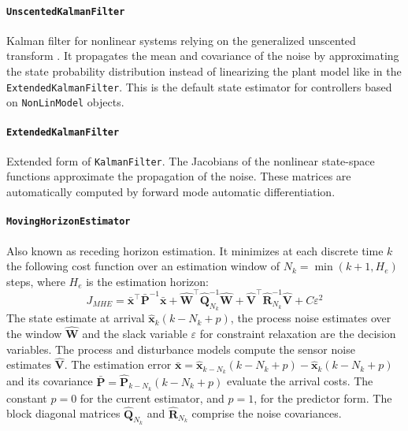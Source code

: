 \paragraph{\texttt{UnscentedKalmanFilter}}
Kalman filter for nonlinear systems relying on the generalized unscented transform \citep{simon}. It propagates the mean and covariance of the noise by approximating the state probability distribution instead of linearizing the plant model like in the \texttt{ExtendedKalmanFilter}. This is the default state estimator for controllers based on \texttt{NonLinModel} objects.

\paragraph{\texttt{ExtendedKalmanFilter}}
Extended form of \texttt{KalmanFilter}. The Jacobians of the nonlinear state-space functions approximate the propagation of the noise. These matrices are automatically computed by forward mode automatic differentiation.

\paragraph{\texttt{MovingHorizonEstimator}}
Also known as receding horizon estimation. It minimizes at each discrete time $k$ the following cost function over an estimation window of $N_k = \min(k+1, H_e)$ steps, where $H_e$ is the estimation horizon:
\begin{equation}\label{eq:J_MHE}
    J_{\mathit{MHE}} = \bar{\mathbf{x}}^\intercal \bar{\mathbf{P}}^{-1} \bar{\mathbf{x}} 
    + \mathbf{\hat{W}}^\intercal \mathbf{\hat{Q}}_{N_k}^{-1} \mathbf{\hat{W}}  
    + \mathbf{\hat{V}}^\intercal \mathbf{\hat{R}}_{N_k}^{-1} \mathbf{\hat{V}}
    + C \varepsilon^2
\end{equation}
The state estimate at arrival $\mathbf{\hat{x}}_k(k-N_k+p)$, the process noise estimates over the window $\mathbf{\hat{W}}$ and the slack variable $\varepsilon$ for constraint relaxation are the decision variables. The process and disturbance models compute the sensor noise estimates $\mathbf{\hat{V}}$. The estimation error $\bar{\mathbf{x}} = \mathbf{\hat{x}}_{k-N_k}(k-N_k+p) - \mathbf{\hat{x}}_{k}(k-N_k+p)$ and its covariance $\bar{\mathbf{P}} = \mathbf{\hat{P}}_{k-N_k}(k-N_k+p)$ evaluate the arrival costs. The constant $p=0$ for the current estimator, and $p=1$, for the predictor form. The block diagonal matrices $\mathbf{\hat{Q}}_{N_k}$ and $\mathbf{\hat{R}}_{N_k}$ comprise the noise covariances.

